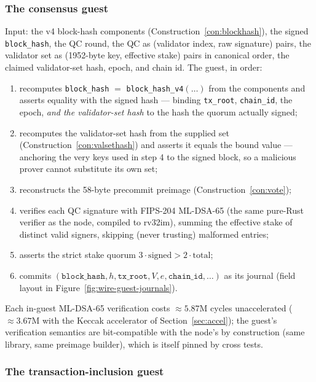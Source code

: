 \documentclass[11pt]{article}
\newcommand{\code}[1]{\texttt{#1}}
\newcommand{\mldsa}{ML\mbox{-}DSA\mbox{-}65}
\theoremstyle{plain}
\theoremstyle{definition}
\theoremstyle{remark}
\begin{document}
\subsubsection{The consensus guest}
\label{sec:consensus-guest}

Input: the v4 block-hash components (Construction~\ref{con:blockhash}), the
signed \code{block\_hash}, the QC round, the QC as (validator index, raw
signature) pairs, the validator set as (1952-byte key, effective stake)
pairs in canonical order, the claimed validator-set hash, epoch, and chain
id. The guest, in order:

\begin{enumerate}[leftmargin=1.6em]
\item recomputes \code{block\_hash} $=$ \code{block\_hash\_v4}$(\ldots)$ from
  the components and asserts equality with the signed hash --- binding
  \code{tx\_root}, \code{chain\_id}, the epoch, \emph{and the validator-set
  hash} to the hash the quorum actually signed;
\item recomputes the validator-set hash from the supplied set
  (Construction~\ref{con:valsethash}) and asserts it equals the bound value
  --- anchoring the very keys used in step 4 to the signed block, so a
  malicious prover cannot substitute its own set;
\item reconstructs the 58-byte precommit preimage
  (Construction~\ref{con:vote});
\item verifies each QC signature with FIPS-204 \mldsa{} (the same
  pure-Rust verifier as the node, compiled to rv32im), summing the effective
  stake of distinct valid signers, skipping (never trusting) malformed
  entries;
\item asserts the strict stake quorum $3 \cdot \mathrm{signed} >
  2 \cdot \mathrm{total}$;
\item commits $(\code{block\_hash}, h, \code{tx\_root}, V, e,
  \code{chain\_id}, \ldots)$ as its journal (field layout in
  Figure~\ref{fig:wire-guest-journals}).
\end{enumerate}

Each in-guest \mldsa{} verification costs $\approx 5.87$M cycles unaccelerated
($\approx 3.67$M with the Keccak accelerator of Section~\ref{sec:accel});
the guest's verification semantics are bit-compatible with the node's by
construction (same library, same preimage builder), which is itself pinned
by cross tests.

\subsubsection{The transaction-inclusion guest}
\label{sec:inclusion-guest}
\end{document}
